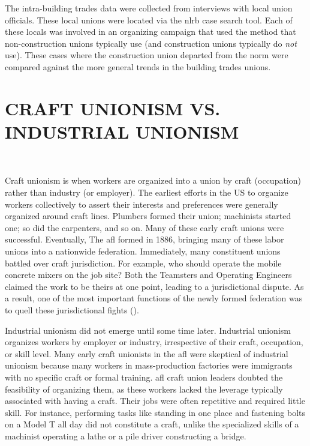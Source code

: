 \documentclass[12pt]{article}
\begin{document}
The intra-building trades data were collected from interviews with local union officials. These local unions were located via the \acrfull{nlrb} case search tool. Each of these locals was involved in an organizing campaign that used the method that non-construction unions typically use (and construction unions typically do \textit{not} use). These cases where the construction union departed from the norm were compared against the more general trends in the building trades unions.

\section{CRAFT UNIONISM VS. INDUSTRIAL UNIONISM} \

Craft unionism is when workers are organized into a union by craft (occupation) rather than industry (or employer). The earliest efforts in the US to organize workers collectively to assert their interests and preferences were generally organized around craft lines. Plumbers formed their union; machinists started one; so did the carpenters, and so on. Many of these early craft unions were successful. Eventually, The \acrfull{afl} formed in 1886, bringing many of these labor unions into a nationwide federation. Immediately, many constituent unions battled over craft jurisdiction. For example, who should operate the mobile concrete mixers on the job site? Both the Teamsters and Operating Engineers claimed the work to be theirs at one point, leading to a jurisdictional dispute. As a result, one of the most important functions of the newly formed federation was to quell these jurisdictional fights (\cite{jaffe1940}).


Industrial unionism did not emerge until some time later. Industrial unionism organizes workers by employer or industry, irrespective of their craft, occupation, or skill level. Many early craft unionists in the \acrshort{afl} were skeptical of industrial unionism because many workers in mass-production factories were immigrants with no specific craft or formal training. \acrshort{afl} craft union leaders doubted the feasibility of organizing them, as these workers lacked the leverage typically associated with having a craft. Their jobs were often repetitive and required little skill. For instance, performing tasks like standing in one place and fastening bolts on a Model T all day did not constitute a craft, unlike the specialized skills of a machinist operating a lathe or a pile driver constructing a bridge.
\end{document}
